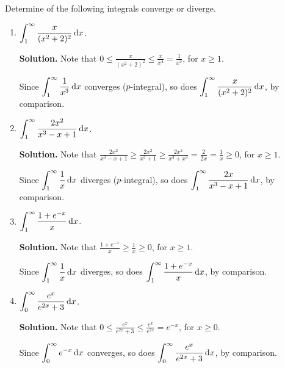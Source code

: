 \begin{Example}{}{}
    Determine of the following integrals converge or diverge.
    \begin{enumerate}[label=(\roman*)]
        \item $ \displaystyle \int_{1}^{\infty} \frac{x}{(x^2+2)^2}\odif{x} $.

              \textbf{Solution.} Note that
              $ \displaystyle  0\leqslant \frac{x}{(x^2+2)^2}\leqslant \frac{x}{x^4}=\frac{1}{x^3} $,
              for $ x\geqslant 1 $.

              Since $ \displaystyle \int_{1}^{\infty} \frac{1}{x^3} \odif{x}  $
              converges ($ p $-integral), so does $ \displaystyle \int_{1}^{\infty} \frac{x}{(x^2+2)^2} \odif{x} $,
              by comparison.
        \item $ \displaystyle \int_{1}^{\infty} \frac{2x^2}{x^3-x+1} \odif{x}  $.

              \textbf{Solution.} Note that
              $ \displaystyle \frac{2x^2}{x^3-x+1} \geqslant \frac{2x^2}{x^3+1} \geqslant \frac{2x^2}{x^3+x^3}=
                  \frac{2}{2x} =\frac{1}{x}\geqslant 0 $,
              for $ x\geqslant 1 $.

              Since $ \displaystyle \int_{1}^{\infty} \frac{1}{x} \odif{x}  $
              diverges ($ p $-integral), so does $ \displaystyle \int_{1}^{\infty} \frac{2x}{x^3-x+1} \odif{x} $,
              by comparison.
        \item $ \displaystyle \int_{1}^{\infty} \frac{1+e^{-x}}{x} \odif{x} $.

              \textbf{Solution.} Note that
              $ \displaystyle \frac{1+e^{-x}}{x} \geqslant \frac{1}{x} \geqslant 0 $,
              for $ x\geqslant 1 $.

              Since $ \displaystyle \int_{1}^{\infty} \frac{1}{x} \odif{x}  $ diverges,
              so does $ \displaystyle \int_{1}^{\infty} \frac{1+e^{-x}}{x} \odif{x}  $, by comparison.
        \item $ \displaystyle \int_{0}^{\infty} \frac{e^x}{e^{2x}+3} \odif{x}  $.

              \textbf{Solution.} Note that
              $ \displaystyle  0\leqslant \frac{e^{x}}{e^{2x}+3} \leqslant \frac{e^{x}}{e^{2x}} =e^{-x} $,
              for $ x\geqslant 0 $.

              Since $ \displaystyle \int_{0}^{\infty} e^{-x}\odif{x}  $ converges,
              so does $ \displaystyle \int_{0}^{\infty} \frac{e^{x}}{e^{2x}+3} \odif{x}  $, by comparison.
    \end{enumerate}
\end{Example}

